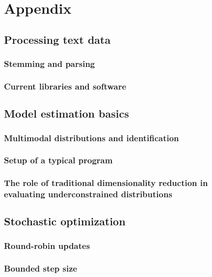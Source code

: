 \chapter{Appendix}

\section{Processing text data}

\subsection{Stemming and parsing}

\subsection{Current libraries and software}

\section{Model estimation basics}

\subsection{Multimodal distributions and identification}

\subsection{Setup of a typical program}

\subsection{The role of traditional dimensionality reduction in evaluating underconstrained distributions}

\section{Stochastic optimization}

\subsection{Round-robin updates}

\subsection{Bounded step size}
